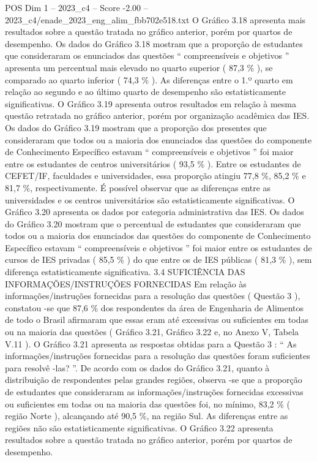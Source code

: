 \begin{textsample}{POS Dim 1 – 2023\_c4 – Score -2.00 – 2023\_c4/enade\_2023\_eng\_alim\_fbb702e518.txt}
O Gráfico 3.18 apresenta mais resultados sobre a questão tratada no gráfico anterior, porém por quartos de desempenho.
Os dados do Gráfico 3.18 mostram que a proporção de estudantes que consideraram os enunciados das questões “ compreensíveis e objetivos ” apresenta um percentual mais elevado no quarto superior ( 87,3 \% ), se comparado ao quarto inferior ( 74,3 \% ).
As diferenças entre o 1.º quarto em relação ao segundo e ao último quarto de desempenho são estatisticamente significativas.
O Gráfico 3.19 apresenta outros resultados em relação à mesma questão retratada no gráfico anterior, porém por organização acadêmica das IES.
Os dados do Gráfico 3.19 mostram que a proporção dos presentes que consideraram que todos ou a maioria dos enunciados das questões do componente de Conhecimento Específico estavam “ compreensíveis e objetivos ” foi maior entre os estudantes de centros universitários ( 93,5 \% ).
Entre os estudantes de CEFET/IF, faculdades e universidades, essa proporção atingiu 77,8 \%, 85,2 \% e 81,7 \%, respectivamente.
É possível observar que as diferenças entre as universidades e os centros universitários são estatisticamente significativas.
O Gráfico 3.20 apresenta os dados por categoria administrativa das IES.
Os dados do Gráfico 3.20 mostram que o percentual de estudantes que consideraram que todos ou a maioria dos enunciados das questões do componente de Conhecimento Específico estavam “ compreensíveis e objetivos ” foi maior entre os estudantes de cursos de IES privadas ( 85,5 \% ) do que entre os de IES públicas ( 81,3 \% ), sem diferença estatisticamente significativa. 3.4 SUFICIÊNCIA DAS INFORMAÇÕES/INSTRUÇÕES FORNECIDAS Em relação às informações/instruções fornecidas para a resolução das questões ( Questão 3 ), constatou -se que 87,6 \% dos respondentes da área de Engenharia de Alimentos de todo o Brasil afirmaram que essas eram até excessivas ou suficientes em todas ou na maioria das questões ( Gráfico 3.21, Gráfico 3.22 e, no Anexo V, Tabela V.11 ).
O Gráfico 3.21 apresenta as respostas obtidas para a Questão 3 : “ As informações/instruções fornecidas para a resolução das questões foram suficientes para resolvê -las? ”.
De acordo com os dados do Gráfico 3.21, quanto à distribuição de respondentes pelas grandes regiões, observa -se que a proporção de estudantes que consideraram as informações/instruções fornecidas excessivas ou suficientes em todas ou na maioria das questões foi, no mínimo, 83,2 \% ( região Norte ), alcançando até 90,5 \%, na região Sul.
As diferenças entre as regiões não são estatisticamente significativas.
O Gráfico 3.22 apresenta resultados sobre a questão tratada no gráfico anterior, porém por quartos de desempenho.

\end{textsample}
